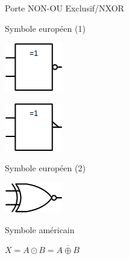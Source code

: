 \documentclass[11pt,a4paper]{article}
\begin{document}
\begin{table}[!ht]
  \centering
  \begin{minipage}{0.70\textwidth}
    \centering

     Porte NON-OU Exclusif/NXOR

    \medskip

    \begin{minipage}{0.50\textwidth}
      \centering
      \begin{center}
      Symbole européen (1)

      \includegraphics[scale=2.00]{img/portes_logiques/2-XNOR/LogicGate-XNOR_eur1.png}

      \medskip

      \includegraphics[scale=2.00]{img/portes_logiques/2-XNOR/LogicGate-XNOR_eur2.png}

      Symbole européen (2)
      \end{center}

    \end{minipage}
    \hfillx
    \begin{minipage}{0.50\textwidth}
      \centering

      \begin{center}

      \includegraphics[scale=2.00]{img/portes_logiques/2-XNOR/LogicGate-XNOR_usa.png}

      Symbole américain
      \end{center}

    \end{minipage}

  \end{minipage}
  \hfillx
  \begin{minipage}{0.30\textwidth}
    \centering

    \begin{center}
    $ X = A \odot B = \overline{A \oplus B} $


\end{center}
\end{minipage}
\end{table}
\end{document}

